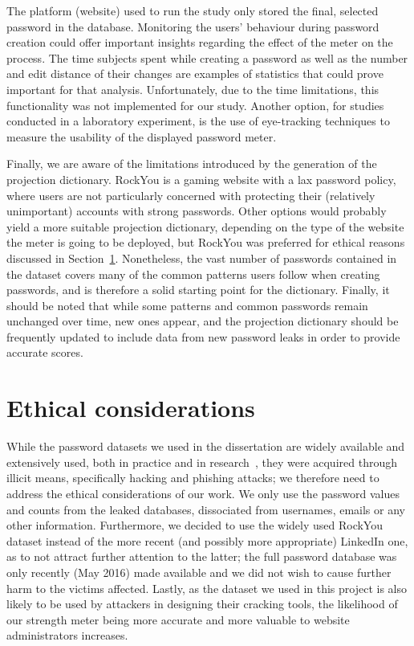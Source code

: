     The platform (website) used to run the study only stored the final, selected password in the database. Monitoring the users' behaviour during password creation could offer important insights regarding the effect of the meter on the process. The time subjects spent while creating a password as well as the number and edit distance of their changes are examples of statistics that could prove important for that analysis. Unfortunately, due to the time limitations, this functionality was not implemented for our study. Another option, for studies conducted in a laboratory experiment, is the use of eye-tracking techniques to measure the usability of the displayed password meter.

    Finally, we are aware of the limitations introduced by the generation of the projection dictionary. RockYou is a gaming website with a lax password policy, where users are not particularly concerned with protecting their (relatively unimportant) accounts with strong passwords. Other options would probably yield a more suitable projection dictionary, depending on the type of the website the meter is going to be deployed, but RockYou was preferred for ethical reasons discussed in Section~\ref{sec:ethical}. Nonetheless, the vast number of passwords contained in the dataset covers many of the common patterns users follow when creating passwords, and is therefore a solid starting point for the dictionary. Finally, it should be noted that while some patterns and common passwords remain unchanged over time, new ones appear, and the projection dictionary should be frequently updated to include data from new password leaks in order to provide accurate scores.


  \section{Ethical considerations}
    \label{sec:ethical}
    While the password datasets we used in the dissertation are widely available and extensively used, both in practice and in research~\cite{pass_strength_empirical,pass_strength,NIST_invalid,rockyou1}, they were acquired through illicit means, specifically hacking and phishing attacks; we therefore need to address the ethical considerations of our work. We only use the password values and counts from the leaked databases, dissociated from usernames, emails or any other information. Furthermore, we decided to use the widely used RockYou dataset instead of the more recent (and possibly more appropriate) LinkedIn one, as to not attract further attention to the latter; the full password database was only recently (May 2016) made available and we did not wish to cause further harm to the victims affected. Lastly, as the dataset we used in this project is also likely to be used by attackers in designing their cracking tools, the likelihood of our strength meter being more accurate and more valuable to website administrators increases.

